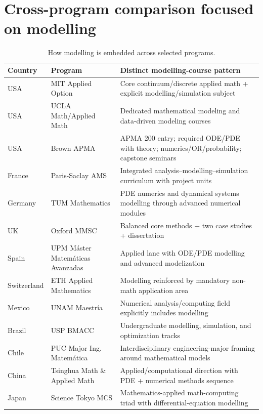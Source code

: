 ﻿\documentclass[11pt,a4paper]{article}
\begin{document}
\section{Cross-program comparison focused on modelling}

\begin{table}[htbp]
\centering
\small
\begin{tabularx}{\linewidth}{@{}l l X@{}}
\toprule
Country & Program & Distinct modelling-course pattern \\
\midrule
USA & MIT Applied Option & Core continuum/discrete applied math + explicit modelling/simulation subject \\
USA & UCLA Math/Applied Math & Dedicated mathematical modeling and data-driven modeling courses \\
USA & Brown APMA & APMA 200 entry; required ODE/PDE with theory; numerics/OR/probability; capstone seminars \\
France & Paris-Saclay AMS & Integrated analysis--modelling--simulation curriculum with project units \\
Germany & TUM Mathematics & PDE numerics and dynamical systems modelling through advanced numerical modules \\
UK & Oxford MMSC & Balanced core methods + two case studies + dissertation \\
Spain & UPM M\'aster Matem\'aticas Avanzadas & Applied lane with ODE/PDE modelling and advanced modelization \\
Switzerland & ETH Applied Mathematics & Modelling reinforced by mandatory non-math application area \\
Mexico & UNAM Maestr\'ia & Numerical analysis/computing field explicitly includes modelling \\
Brazil & USP BMACC & Undergraduate modelling, simulation, and optimization tracks \\
Chile & PUC Major Ing. Matem\'atica & Interdisciplinary engineering-major framing around mathematical models \\
China & Tsinghua Math \& Applied Math & Applied/computational direction with PDE + numerical methods sequence \\
Japan & Science Tokyo MCS & Mathematics-applied math-computing triad with differential-equation modelling \\
\bottomrule
\end{tabularx}
\caption{How modelling is embedded across selected programs.}
\end{table}
\end{document}
